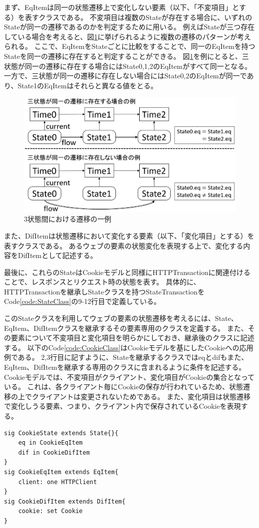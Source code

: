 \documentclass[12pt,a4paper]{jbook}
\begin{document}
まず、EqItemは同一の状態遷移上で変化しない要素（以下、「不変項目」とする）を表すクラスである。
不変項目は複数のStateが存在する場合に、いずれのStateが同一の遷移であるのかを判定するために用いる。
例えばStateが三つ存在している場合を考えると、図\ref{fig:ProposedModel-3StateFlow}に挙げられるように複数の遷移のパターンが考えられる。
ここで、EqItemをStateごとに比較をすることで、同一のEqItemを持つStateを同一の遷移に存在すると判定することができる。
図\ref{fig:ProposedModel-3StateFlow}を例にとると、三状態が同一の遷移に存在する場合にはState0,1,2のEqItemがすべて同一となる。
一方で、三状態が同一の遷移に存在しない場合にはState0,2のEqItemが同一であり、State1のEqItemはそれらと異なる値をとる。

\begin{figure}[htb]
\centering
\includegraphics[width=400pt]{./fig/ProposedModel-3StateFlow.eps}
\caption{3状態間における遷移の一例}
\label{fig:ProposedModel-3StateFlow}
\end{figure}

また、DifItemは状態遷移において変化する要素（以下、「変化項目」とする）を表すクラスである。
あるウェブの要素の状態変化を表現する上で、変化する内容をDifItemとして記述する。

最後に、これらのStateはCookieモデルと同様にHTTPTransactionに関連付けることで、レスポンスとリクエスト時の状態を表す。
具体的に、HTTPTransactionを継承しStateクラスを持つStateTransactionをCode\ref{code:StateClass}の9-12行目で定義している。

このStateクラスを利用してウェブの要素の状態遷移を考えるには、State、EqItem、DifItemクラスを継承するその要素専用のクラスを定義する。
また、その要素について不変項目と変化項目を明らかにしておき、継承後のクラスに記述する。
以下のCode\ref{code:CookieClass}はCookieモデルを基にしたCookieへの応用例である。
2,3行目に記すように、Stateを継承するクラスではeqとdifもまた、EqItem、DifItemを継承する専用のクラスに含まれるように条件を記述する。
Cookieモデルでは、不変項目がクライアント、変化項目がCookieの集合となっている。
これは、各クライアント毎にCookieの保存が行われているため、状態遷移の上でクライアントは変更されないためである。
また、変化項目は状態遷移で変化しうる要素、つまり、クライアント内で保存されているCookieを表現する。
\begin{lstlisting}[caption=Cookieへの応用例, label=code:CookieClass]
sig CookieState extends State{}{
	eq in CookieEqItem
	dif in CookieDifItem
}
sig CookieEqItem extends EqItem{
	client: one HTTPClient
}
sig CookieDifItem extends DifItem{
	cookie: set Cookie
}
\end{lstlisting}
\end{document}
